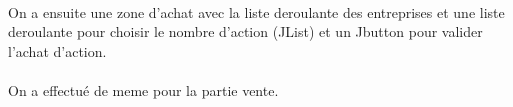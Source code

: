 \paragraph{} On a ensuite une zone d'achat avec la liste deroulante des entreprises et une liste deroulante pour choisir le nombre d'action (JList) et un Jbutton pour valider l'achat d'action. 
\paragraph{} On a effectué de meme pour la partie vente.



